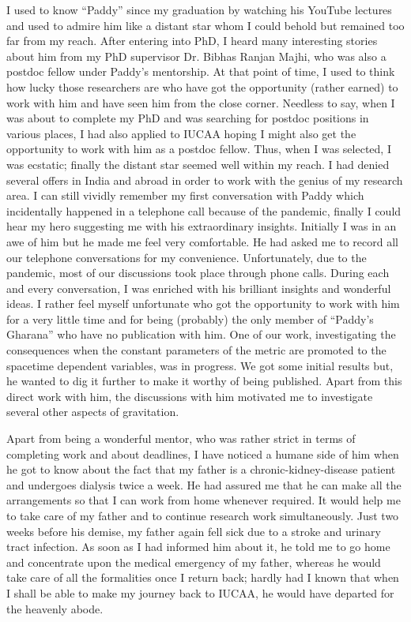 \documentclass[prd, preprint, longbibliography, 11pt]{revtex4-1}
\begin{document}
\noindent  I used to know “Paddy” since my graduation by watching his YouTube lectures and used to admire him like a distant star whom I could behold but remained too far from my reach. After entering into PhD, I heard many interesting stories about him from my PhD supervisor Dr. Bibhas Ranjan Majhi, who was also a postdoc fellow under Paddy’s mentorship. At that point of time, I used to think how lucky those researchers are who have got the opportunity (rather earned) to work with him and have seen him from the close corner. Needless to say, when I was about to complete my PhD and was searching for postdoc positions in various places, I had also applied to IUCAA hoping I might also get the opportunity to work with him as a postdoc fellow. Thus, when I was selected, I was ecstatic; finally the distant star seemed well within my reach. I had denied several offers in India and abroad in order to work with the genius of my research area. I can still vividly remember my first conversation with Paddy which incidentally happened in a telephone call because of the pandemic, finally I could hear my hero suggesting me with his extraordinary insights. Initially I was in an awe of him but he made me feel very comfortable. He had asked me to record all our telephone conversations for my convenience. Unfortunately, due to the pandemic, most of our discussions took place through phone calls. During each and every conversation, I was enriched with his brilliant insights and wonderful ideas. I rather feel myself unfortunate who got the opportunity to work with him for a very little time and for being (probably) the only member of “Paddy’s Gharana” who have no publication with him. One of our work, investigating the consequences when the constant parameters of the metric are promoted to the spacetime dependent variables, was in progress. We got some initial results but, he wanted to dig it further to make it worthy of being published. Apart from this direct work with him, the discussions with him motivated me to investigate several other aspects of gravitation.

    Apart from being a wonderful mentor, who was rather strict in terms of completing work and about deadlines, I have noticed a humane side of him when he got to know about the fact that my father is a chronic-kidney-disease patient and undergoes dialysis twice a week. He had assured me that he can make all the arrangements so that I can work from home whenever required. It would help me to take care of my father and to continue research work simultaneously. Just two weeks before his demise, my father again fell sick due to a stroke and urinary tract infection. As soon as I had informed him about it, he told me to go home and concentrate upon the medical emergency of my father, whereas he would take care of all the formalities once I return back; hardly had I known that when I shall be able to make my journey back to IUCAA, he would have departed for the heavenly abode.
\end{document}
